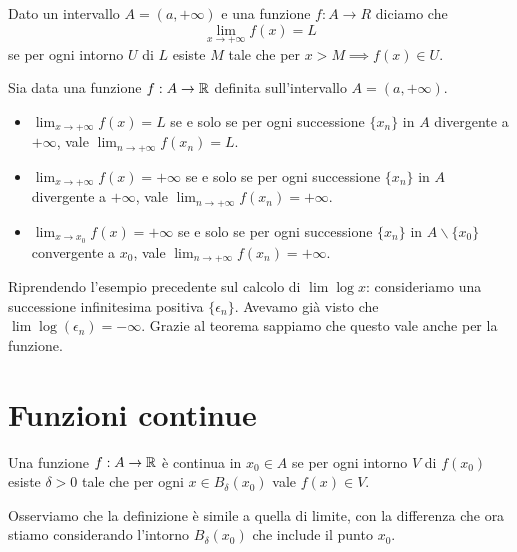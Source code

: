 \begin{definition}
Dato un intervallo $A = (a, +\infty)$ e una funzione $f: A \to R$ diciamo che
\begin{equation*}
\lim_{x \to +\infty} f(x) = L
\end{equation*}
se per ogni intorno $U$ di $L$ esiste $M$ tale che per $x > M \implies f(x) \in U$.
\end{definition}

\begin{theorem}
Sia data una funzione $f: A \to \mathbb R$ definita sull'intervallo $A = (a, +\infty)$. 

\begin{itemize}
\item $\lim_{x \to +\infty} f(x) = L$ se e solo se per ogni successione $\{x_n\}$ in $A$ divergente a $+\infty$, vale $\lim_{n \to +\infty} f(x_n) = L$.

\item $\lim_{x \to +\infty} f(x) = +\infty$ se e solo se per ogni successione $\{x_n\}$ in $A$ divergente a $+\infty$, vale $\lim_{n \to +\infty} f(x_n) = +\infty$.

\item $\lim_{x \to x_0} f(x) = +\infty$ se e solo se per ogni successione $\{x_n\}$ in $A \backslash\{x_0\}$ convergente a $x_0$, vale $\lim_{n \to +\infty} f(x_n) = +\infty$.

\end{itemize}
\end{theorem}

\begin{example}
Riprendendo l'esempio precedente sul calcolo di $\lim \log x$:  consideriamo una successione infinitesima positiva $\{\epsilon_n\}$. Avevamo già visto che $\lim \log (\epsilon_n) = -\infty$. Grazie al teorema sappiamo che questo vale anche per la funzione.
\end{example}

\section{Funzioni continue}
\begin{definition}
Una funzione $f: A \to \mathbb R$ è continua in $x_0 \in A$ se per ogni intorno $V$ di $f(x_0)$ esiste $\delta > 0$ tale che per ogni $x \in B_\delta (x_0)$ vale $f(x) \in V$.
\end{definition}

Osserviamo che la definizione è simile a quella di limite, con la differenza che ora stiamo considerando l'intorno $B_\delta (x_0)$ che include il punto $x_0$.

